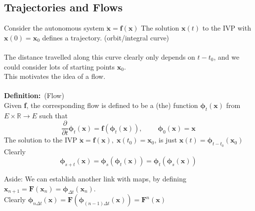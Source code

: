 \documentclass{article}
\newcommand{\definition}{\textbf{Definition:}}              %
\newcommand{\bp}{\bm{\phi}}                                 %
\begin{document}
\subsection{Trajectories and Flows}
Consider the autonomous system
$ \dot{\textbf{x}} = \textbf{f}(\textbf{x}) $
The solution $\textbf{x}(t)$ to the IVP with $\textbf{x}(0) = \textbf{x}_0$
defines a trajectory. (orbit/integral curve)
\\
\\
The distance travelled along this curve clearly only depends on $t - t_0$, 
and we could consider lots of starting points $\textbf{x}_0$.
\\
This motivates the idea of a flow. 
\\
\\
\definition\ (Flow) \\
Given \textbf{f}, the corresponding flow is defined to be a (the) function
$\bp_t (\textbf{x}) $ from $E \times \mathbb{R} \to E$ such that
\[ 
\frac{\partial}{\partial t} \bp_t ( \bm{x} ) = \bm{f}(\bp_t (\bm{x} ) ), \qquad\
\bp_0(\bm{x}) = \bm{x} 
 \]
The solution to the IVP $\dot{\bm{x}} = \bm{f}(\bm{x}), \; \bm{x}(t_0) = \bm{x}_0$,
is just $\bm{x}(t) = \bp_{t - t_0} (\bm{x}_0)$
\\
Clearly 
\[ \bp_{s+t}(\bm{x}) = \bp_s(\bp_t(\bm{x})) = \bp_t ( \bp_s (\bm{x} ) ) \]
\begin{framed}
\noindent Aside: We can establish another link with maps, by defining 
$\bm{x}_{n+1} = \bm{F}(\bm{x}_n) = \bp_{\Delta t} (\bm{x}_n)$. \\
Clearly $\bp_{n \Delta t} (\bm{x} ) = \bm{F} ( \bp_{(n-1) \Delta t} (\bm{x} )) = \bm{F}^n(\bm{x}) $ 
\end{framed}
\end{document}
